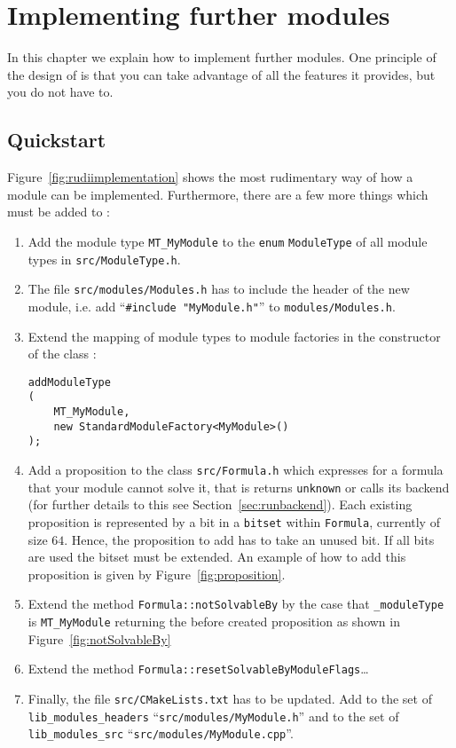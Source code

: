 \chapter{Implementing further modules}
\label{chapter:implementingamodule}
In this chapter we explain how to implement further modules. One
principle of the design of \smtrat is that you can take advantage of
all the features it provides, but you do not have to.

\section{Quickstart}
Figure~\ref{fig:rudiimplementation} shows the most rudimentary way of how a module
can be implemented. Furthermore, there are a few more things which must be added to
\smtrat:
\begin{enumerate}
	\item Add the module type \texttt{MT\_MyModule} to the \texttt{enum}
		\texttt{ModuleType} of all module types in \texttt{src/ModuleType.h}.
	\item The file \texttt{src/modules/Modules.h} has to include the header of the new module, i.e.
		add ``\texttt{\#include "MyModule.h"}'' to  \texttt{modules/Modules.h}.
	\item Extend the mapping of module types to module factories in the constructor
		of the class \managerClass:
\begin{verbatim}
addModuleType
(
    MT_MyModule,
    new StandardModuleFactory<MyModule>()
);
\end{verbatim}
	\item Add a proposition to the class \texttt{src/Formula.h} which expresses for a
		formula	that your module cannot solve it, that is returns
		\texttt{unknown} or calls its backend
		(for further details to this see Section~\ref{sec:runbackend}). Each existing
		proposition is represented by a bit in a \texttt{bitset} within \texttt{Formula},
		currently of size $64$.	Hence, the proposition to add has to take an unused bit.
		If all bits are used the bitset must be extended.
		An example of how to add this proposition is given by
		Figure~\ref{fig:proposition}.
	\item Extend the method \texttt{Formula::notSolvableBy}
		by the case that \texttt{\_moduleType} is \texttt{MT\_MyModule} returning
		the before created proposition as shown in Figure~\ref{fig:notSolvableBy}
	\item Extend the method \texttt{Formula::resetSolvableByModuleFlags}\ldots

	\item Finally, the file \texttt{src/CMakeLists.txt} has to be updated. Add to the set
		of \texttt{lib\_modules\_headers} ``\texttt{src/modules/MyModule.h}'' and to the set
		of \texttt{lib\_modules\_src} ``\texttt{src/modules/MyModule.cpp}''.
\end{enumerate}

